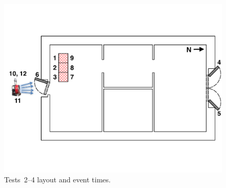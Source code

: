 \begin{figure}[!ht]
\begin{minipage}[b]{1.01\columnwidth}
\begin{center}
\end{center}
\end{minipage}
\begin{minipage}[b]{0.9\columnwidth}
	\vspace{20pt}
	\centering
	\includegraphics[width=\columnwidth]{Figures/Floor_Plans/East_Structure_Test_4}
\end{minipage}
\renewcommand{\baselinestretch}{1}
\caption{Tests~2--4 layout and event times.}
\label{fig:Tests_2-4_layout}
\end{figure}
\FloatBarrier
\renewcommand{\baselinestretch}{2}

